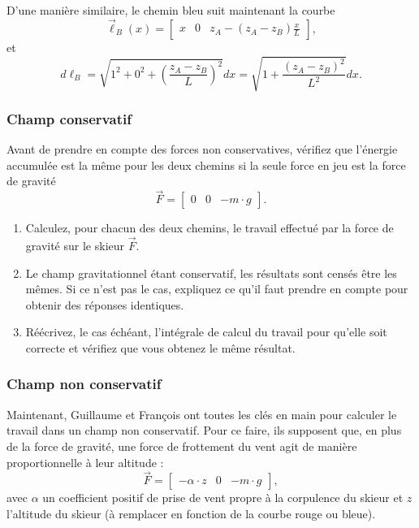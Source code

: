 \documentclass[10pt,oneside]{article}
\begin{document}
D'une manière similaire, le chemin bleu suit maintenant la courbe
\begin{equation}
    \vec{\ell}_B(x) = \begin{bmatrix}x & 0 & z_A - (z_A - z_B)\frac{x}{L}\end{bmatrix},
\end{equation}
et
\begin{equation}
    d\ell_B = \sqrt{1^2 + 0^2 + (\frac{z_A - z_B}{L})^2} dx = \sqrt{1 + \frac{(z_A - z_B)^2}{L^2}} dx.
\end{equation}

\subsubsection{Champ conservatif}

Avant de prendre en compte des forces non conservatives, vérifiez que l'énergie accumulée est la même pour les deux chemins si la seule force en jeu est la force de gravité
\begin{equation}
\vec{F} = \begin{bmatrix} 0 & 0 &-m\cdot g\end{bmatrix}.
\end{equation}

\begin{enumerate}
    \item Calculez, pour chacun des deux chemins, le travail effectué par la force de gravité sur le skieur $\vec{F}$.
    \item Le champ gravitationnel étant conservatif, les résultats sont censés être les mêmes. Si ce n'est pas le cas, expliquez ce qu'il faut prendre en compte pour obtenir des réponses identiques.
    \item Réécrivez, le cas échéant, l'intégrale de calcul du travail pour qu'elle soit correcte et vérifiez que vous obtenez le même résultat.
\end{enumerate}

\subsubsection{Champ non conservatif}

Maintenant, Guillaume et François ont toutes les clés en main pour calculer le travail dans un champ non conservatif. Pour ce faire, ils supposent que, en plus de la force de gravité, une force de frottement du vent agit de manière proportionnelle à leur altitude :
\begin{equation}
     \vec{F} = \begin{bmatrix} -\alpha \cdot z & 0 &-m\cdot g \end{bmatrix},
\end{equation}
avec $\alpha$ un coefficient positif de prise de vent propre à la corpulence du skieur et $z$ l'altitude du skieur (à remplacer en fonction de la courbe rouge ou bleue).
\end{document}
